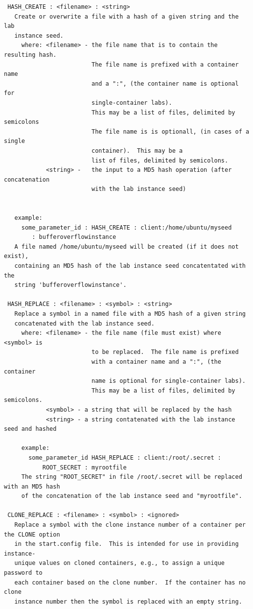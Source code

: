 \documentclass[12pt]{article}
\begin{document}
\begin{verbatim}
 HASH_CREATE : <filename> : <string>
   Create or overwrite a file with a hash of a given string and the lab 
   instance seed.
     where: <filename> - the file name that is to contain the resulting hash.
                         The file name is prefixed with a container name 
                         and a ":", (the container name is optional for 
                         single-container labs).  
                         This may be a list of files, delimited by semicolons 
                         The file name is is optionall, (in cases of a single
                         container).  This may be a 
                         list of files, delimited by semicolons.
            <string> -   the input to a MD5 hash operation (after concatenation 
                         with the lab instance seed)
                       
                   
   example:
     some_parameter_id : HASH_CREATE : client:/home/ubuntu/myseed 
        : bufferoverflowinstance
   A file named /home/ubuntu/myseed will be created (if it does not exist), 
   containing an MD5 hash of the lab instance seed concatentated with the 
   string 'bufferoverflowinstance'.
 
 HASH_REPLACE : <filename> : <symbol> : <string>
   Replace a symbol in a named file with a MD5 hash of a given string 
   concatenated with the lab instance seed.
     where: <filename> - the file name (file must exist) where <symbol> is 
                         to be replaced.  The file name is prefixed 
                         with a container name and a ":", (the container 
                         name is optional for single-container labs).  
                         This may be a list of files, delimited by semicolons. 
            <symbol> - a string that will be replaced by the hash
            <string> - a string contatenated with the lab instance seed and hashed

     example:
       some_parameter_id HASH_REPLACE : client:/root/.secret : 
           ROOT_SECRET : myrootfile
     The string "ROOT_SECRET" in file /root/.secret will be replaced with an MD5 hash
     of the concatenation of the lab instance seed and "myrootfile".

 CLONE_REPLACE : <filename> : <symbol> : <ignored>
   Replace a symbol with the clone instance number of a container per the CLONE option
   in the start.config file.  This is intended for use in providing instance-
   unique values on cloned containers, e.g., to assign a unique password to
   each container based on the clone number.  If the container has no clone
   instance number then the symbol is replaced with an empty string.
\end{verbatim}
\end{document}
